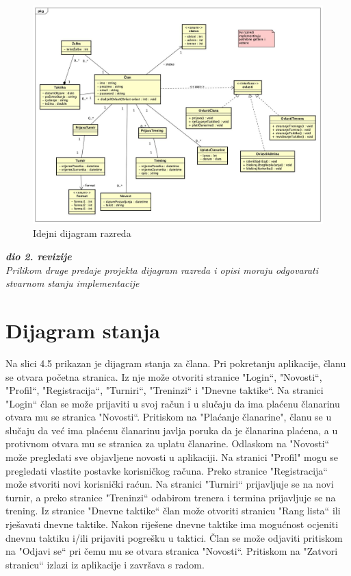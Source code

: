			\eject
			
			\begin{figure}[H]
					\centerfloat
					\advance{}
        					\includegraphics[scale=0.35]{dijagrami/Classdiagram.jpg} %
        					\caption{Idejni dijagram razreda}
        					\label{fig:idejniDijagramRazreda}
				\end{figure}

			
			\textbf{\textit{dio 2. revizije}}\\			
			
			\textit{Prilikom druge predaje projekta dijagram razreda i opisi moraju odgovarati stvarnom stanju implementacije}
			
			
			
			\eject
		
		\section{Dijagram stanja}
			
			
			Na slici 4.5 prikazan je dijagram stanja za člana. Pri pokretanju aplikacije, članu se otvara početna stranica. Iz nje može otvoriti stranice "Login“, "Novosti“,  "Profil“, "Registracija“, "Turniri“, "Treninzi“ i "Dnevne taktike“. Na stranici "Login“ član se može prijaviti u svoj račun i u slučaju da ima plaćenu članarinu otvara mu se stranica "Novosti“. Pritiskom na "Plaćanje članarine", članu se u slučaju da već ima plaćenu članarinu javlja poruka da je članarina plaćena, a u protivnom otvara mu se stranica za uplatu članarine. Odlaskom na "Novosti“ može pregledati sve objavljene novosti u aplikaciji. Na stranici "Profil" mogu se pregledati vlastite postavke korisničkog računa. Preko stranice "Registracija“ može stvoriti novi korisnički raćun. Na stranici "Turniri“ prijavljuje se na novi turnir, a preko stranice "Treninzi“ odabirom trenera i termina prijavljuje se na trening. Iz stranice "Dnevne taktike“ član može otvoriti stranicu "Rang lista“ ili rješavati dnevne taktike. Nakon riješene dnevne taktike ima mogućnost ocjeniti dnevnu taktiku i/ili prijaviti pogrešku u taktici. Član se može odjaviti pritiskom na "Odjavi se“ pri čemu mu se otvara stranica "Novosti“. Pritiskom na "Zatvori stranicu“ izlazi iz aplikacije i završava s radom.
				
